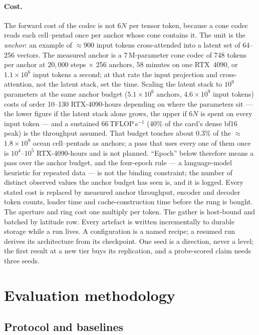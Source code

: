 \documentclass[10pt]{article}
\begin{document}
\paragraph{Cost.} The forward cost of the codec is not $6N$ per tensor token,
because a cone codec reads each cell--pentad once per anchor whose cone
contains it. The unit is the \emph{anchor}: an example of ${\approx}$900
input tokens cross-attended into a latent set of 64--256 vectors. The
measured anchor is a 7\,M-parameter cone codec of 748 tokens per anchor at
$20{,}000$ steps $\times$ 256 anchors, 58 minutes on one RTX~4090, or
$1.1\times10^6$ input tokens a second; at that rate the input projection and
cross-attention, not the latent stack, set the time. Scaling the latent
stack to $10^9$ parameters at the same anchor budget ($5.1\times10^6$
anchors, $4.6\times10^9$ input tokens) costs of order 10--130 RTX-4090-hours
depending on where the parameters sit --- the lower figure if the latent
stack alone grows, the upper if $6N$ is spent on every input token --- and a
sustained 66\,TFLOP\,s$^{-1}$ (40\% of the card's dense bf16 peak) is the
throughput assumed. That budget touches about $0.3\%$ of the
${\approx}$$1.8\times10^9$ ocean cell--pentads as anchors; a pass that uses
every one of them once is $10^4$--$10^5$ RTX-4090-hours and is not planned.
``Epoch'' below therefore means a pass over the anchor budget, and the
four-epoch rule \cite{datacon} --- a language-model heuristic for repeated
data --- is not the binding constraint; the number of distinct observed
values the anchor budget has seen is, and it is logged. Every stated cost is
replaced by measured anchor throughput, encoder and decoder token counts,
loader time and cache-construction time before the rung is bought. The
aperture and ring cost one multiply per token. The gather is host-bound and
batched by latitude row. Every artefact is written incrementally to durable
storage while a run lives. A configuration is a named recipe; a resumed run
derives its architecture from its checkpoint. One seed is a direction, never
a level; the first result at a new tier buys its replication, and a
probe-scored claim needs three seeds.

\section{Evaluation methodology}\label{sec:eval}

\subsection{Protocol and baselines}\label{sec:eval-protocol}
\end{document}
